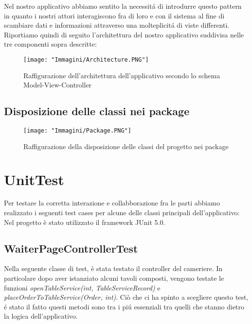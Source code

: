 \documentclass{article}
\begin{document}
\newpage

\noindent Nel nostro applicativo abbiamo sentito la necessit\'a di introdurre questo pattern in quanto i nostri attori interagiscono fra di loro e con il sistema al fine di scambiare dati e informazioni attraverso una molteplicit\'a di viste differenti. \\
Riportiamo quindi di seguito l'architettura del nostro applicativo suddivisa nelle tre componenti sopra descritte:

\begin{figure}[!h]
\centering
\texttt{[image: "Immagini/Architecture.PNG"]}
\caption{Raffigurazione dell'architettura dell'applicativo secondo lo schema Model-View-Controller}
\end{figure}

\newpage

\subsection{Disposizione delle classi nei package} 

\begin{figure}[!h]
\centering
\texttt{[image: "Immagini/Package.PNG"]}
\caption{Raffigurazione della disposizione delle classi del progetto nei package}
\end{figure}

\newpage

\section{UnitTest}
Per testare la corretta interazione e collabborazione fra le parti abbiamo realizzato i seguenti test cases per alcune delle classi principali dell’applicativo: \\
\newline
Nel progetto è stato utilizzato il framework JUnit 5.0.

\subsection{WaiterPageControllerTest}

Nella seguente classe di test, è stata testato il controller del cameriere. In particolare dopo aver istanziato alcuni tavoli composti, vengono testate le funzioni \textit{openTableService(int, TableServiceRecord)} e \textit{placeOrderToTableService(Order, int)}. Ciò che ci ha spinto a scegliere questo test, \'e stato il fatto questi metodi sono tra i pi\'u essenziali tra quelli che stanno dietro la logica dell’applicativo.
\end{document}
